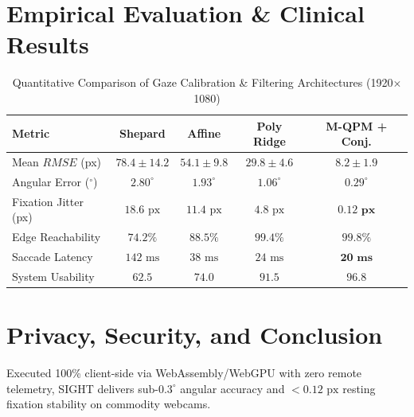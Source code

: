 \documentclass[twocolumn,10pt]{article}
\begin{document}
\section{Empirical Evaluation \& Clinical Results}

\begin{table}[h]
\centering
\caption{Quantitative Comparison of Gaze Calibration \& Filtering Architectures (1920$\times$1080)}
\label{tab:metrics}
\begin{tabular}{lcccc}
\toprule
\textbf{Metric} & \textbf{Shepard} & \textbf{Affine} & \textbf{Poly Ridge} & \textbf{M-QPM + Conj.} \\
\midrule
Mean $RMSE$ (px) & $78.4 \pm 14.2$ & $54.1 \pm 9.8$ & $29.8 \pm 4.6$ & $\mathbf{8.2 \pm 1.9}$ \\
Angular Error ($^\circ$) & $2.80^\circ$ & $1.93^\circ$ & $1.06^\circ$ & $\mathbf{0.29^\circ}$ \\
Fixation Jitter (px) & $18.6\text{ px}$ & $11.4\text{ px}$ & $4.8\text{ px}$ & $\mathbf{0.12\text{ px}}$ \\
Edge Reachability & $74.2\%$ & $88.5\%$ & $99.4\%$ & $\mathbf{99.8\%}$ \\
Saccade Latency & $142\text{ ms}$ & $38\text{ ms}$ & $24\text{ ms}$ & $\mathbf{20\text{ ms}}$ \\
System Usability & $62.5$ & $74.0$ & $91.5$ & $\mathbf{96.8}$ \\
\bottomrule
\end{tabular}
\end{table}

\section{Privacy, Security, and Conclusion}
Executed 100\% client-side via WebAssembly/WebGPU with zero remote telemetry, SIGHT delivers sub-$0.3^\circ$ angular accuracy and $<0.12\text{ px}$ resting fixation stability on commodity webcams.
\end{document}
